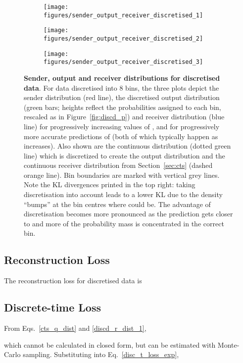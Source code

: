 \documentclass[11pt,table]{article}
\newcommand{\0}[1]{\constvec{0}{#1}}
\newcommand{\1}[1]{\constvec{1}{#1}}
\begin{document}
\begin{figure}[t!]
\centering
\begin{subfigure}[b]{\textwidth}
\texttt{[image: figures/sender\_output\_receiver\_discretised\_1]}
\end{subfigure}
\begin{subfigure}[b]{\textwidth}
\texttt{[image: figures/sender\_output\_receiver\_discretised\_2]}
\end{subfigure}
\begin{subfigure}[b]{\textwidth}
\texttt{[image: figures/sender\_output\_receiver\_discretised\_3]}
\end{subfigure}
\caption{\textbf{Sender, output and receiver distributions for discretised data}. For data  discretised into 8 bins, the three plots depict the sender distribution (red line), the discretised output distribution (green bars; heights reflect the probabilities assigned to each bin, rescaled as in Figure~\ref{fig:discd_p}) and receiver distribution (blue line) for progressively increasing values of , and for progressively more accurate predictions of  (both of which typically happen as  increases). Also shown are the continuous distribution  (dotted green line) which is discretized to create the output distribution and the continuous receiver distribution from Section~\ref{sec:cts} (dashed orange line). Bin boundaries are marked with vertical grey lines. Note the KL divergences printed in the top right: taking discretisation into account leads to a lower KL due to the density ``bumps'' at the bin centres where  could be. The advantage of discretisation becomes more pronounced as the prediction gets closer to  and more of the probability mass is concentrated in the correct bin.}
\end{figure}
\subsection{Reconstruction Loss \texorpdfstring{}{}}\label{sec:discd_reconstruction}
The reconstruction loss for discretised data is

\subsection{Discrete-time Loss \texorpdfstring{}{}}
From Eqs.~\ref{cts_q_dist} and \ref{discd_r_dist_1},

which cannot be calculated in closed form, but can be estimated with Monte-Carlo sampling.
Substituting into Eq.~\ref{disc_t_loss_exp},
\end{document}
